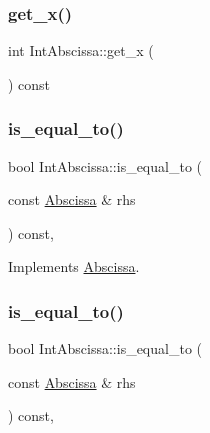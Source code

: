 \subsubsection{\texorpdfstring{get\_x()}{get\_x()}\hspace{0.1cm}{\footnotesize\ttfamily [2/2]}}
{\footnotesize\ttfamily int Int\+Abscissa\+::get\+\_\+x (\begin{DoxyParamCaption}{ }\end{DoxyParamCaption}) const\hspace{0.3cm}{\ttfamily [inline]}}

\mbox{\label{classIntAbscissa_a4d7663a45e6882b5d57dd59262d3900b}} 
\subsubsection{\texorpdfstring{is\_equal\_to()}{is\_equal\_to()}\hspace{0.1cm}{\footnotesize\ttfamily [1/2]}}
{\footnotesize\ttfamily bool Int\+Abscissa\+::is\+\_\+equal\+\_\+to (\begin{DoxyParamCaption}\item[{const \mbox{\hyperlink{classAbscissa}{Abscissa}} \&}]{rhs }\end{DoxyParamCaption}) const\hspace{0.3cm}{\ttfamily [inline]}, {\ttfamily [virtual]}}



Implements \mbox{\hyperlink{classAbscissa_a4adf4055c1eee010f9493e0ebb66348a}{Abscissa}}.

\mbox{\label{classIntAbscissa_a4d7663a45e6882b5d57dd59262d3900b}} 
\subsubsection{\texorpdfstring{is\_equal\_to()}{is\_equal\_to()}\hspace{0.1cm}{\footnotesize\ttfamily [2/2]}}
{\footnotesize\ttfamily bool Int\+Abscissa\+::is\+\_\+equal\+\_\+to (\begin{DoxyParamCaption}\item[{const \mbox{\hyperlink{classAbscissa}{Abscissa}} \&}]{rhs }\end{DoxyParamCaption}) const\hspace{0.3cm}{\ttfamily [inline]}, {\ttfamily [virtual]}}



